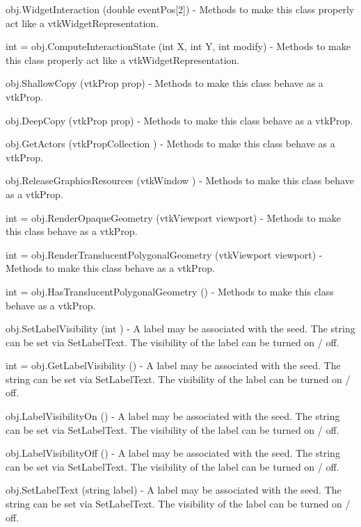 \begin{DoxyItemize}
\item {\ttfamily obj.\-Widget\-Interaction (double event\-Pos\mbox{[}2\mbox{]})} -\/ Methods to make this class properly act like a vtk\-Widget\-Representation.  
\item {\ttfamily int = obj.\-Compute\-Interaction\-State (int X, int Y, int modify)} -\/ Methods to make this class properly act like a vtk\-Widget\-Representation.  
\item {\ttfamily obj.\-Shallow\-Copy (vtk\-Prop prop)} -\/ Methods to make this class behave as a vtk\-Prop.  
\item {\ttfamily obj.\-Deep\-Copy (vtk\-Prop prop)} -\/ Methods to make this class behave as a vtk\-Prop.  
\item {\ttfamily obj.\-Get\-Actors (vtk\-Prop\-Collection )} -\/ Methods to make this class behave as a vtk\-Prop.  
\item {\ttfamily obj.\-Release\-Graphics\-Resources (vtk\-Window )} -\/ Methods to make this class behave as a vtk\-Prop.  
\item {\ttfamily int = obj.\-Render\-Opaque\-Geometry (vtk\-Viewport viewport)} -\/ Methods to make this class behave as a vtk\-Prop.  
\item {\ttfamily int = obj.\-Render\-Translucent\-Polygonal\-Geometry (vtk\-Viewport viewport)} -\/ Methods to make this class behave as a vtk\-Prop.  
\item {\ttfamily int = obj.\-Has\-Translucent\-Polygonal\-Geometry ()} -\/ Methods to make this class behave as a vtk\-Prop.  
\item {\ttfamily obj.\-Set\-Label\-Visibility (int )} -\/ A label may be associated with the seed. The string can be set via Set\-Label\-Text. The visibility of the label can be turned on / off.  
\item {\ttfamily int = obj.\-Get\-Label\-Visibility ()} -\/ A label may be associated with the seed. The string can be set via Set\-Label\-Text. The visibility of the label can be turned on / off.  
\item {\ttfamily obj.\-Label\-Visibility\-On ()} -\/ A label may be associated with the seed. The string can be set via Set\-Label\-Text. The visibility of the label can be turned on / off.  
\item {\ttfamily obj.\-Label\-Visibility\-Off ()} -\/ A label may be associated with the seed. The string can be set via Set\-Label\-Text. The visibility of the label can be turned on / off.  
\item {\ttfamily obj.\-Set\-Label\-Text (string label)} -\/ A label may be associated with the seed. The string can be set via Set\-Label\-Text. The visibility of the label can be turned on / off.  

\end{DoxyItemize}
